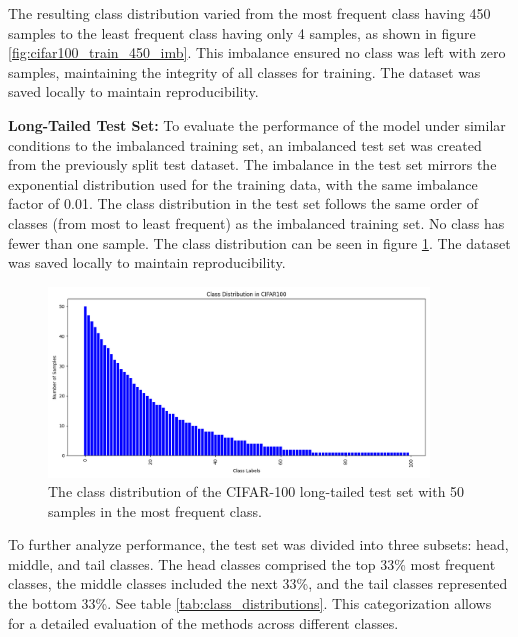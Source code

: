 The resulting class distribution varied from the most frequent class having 450 samples to the least frequent class having only 4 samples, as shown in figure \ref{fig:cifar100_train_450_imb}. This imbalance ensured no class was left with zero samples, maintaining the integrity of all classes for training. The dataset was saved locally to maintain reproducibility.


\textbf{Long-Tailed Test Set:} To evaluate the performance of the model under similar conditions to the imbalanced training set, an imbalanced test set was created from the previously split test dataset. The imbalance in the test set mirrors the exponential distribution used for the training data, with the same imbalance factor of 0.01. The class distribution in the test set follows the same order of classes (from most to least frequent) as the imbalanced training set. No class has fewer than one sample. The class distribution can be seen in figure \ref{fig:cifar100_test_imb}. The dataset was saved locally to maintain reproducibility.


\begin{figure}[h!]
    \centering
    \includegraphics[width=0.9\textwidth]{Images/Plots/cifar100_test_imb.png}
    \caption{The class distribution of the CIFAR-100 long-tailed test set with 50 samples in the most frequent class.}
    \label{fig:cifar100_test_imb}
\end{figure}

To further analyze performance, the test set was divided into three subsets: head, middle, and tail classes. The head classes comprised the top 33\% most frequent classes, the middle classes included the next 33\%, and the tail classes represented the bottom 33\%. See table \ref{tab:class_distributions}. This categorization allows for a detailed evaluation of the methods across different classes. 


